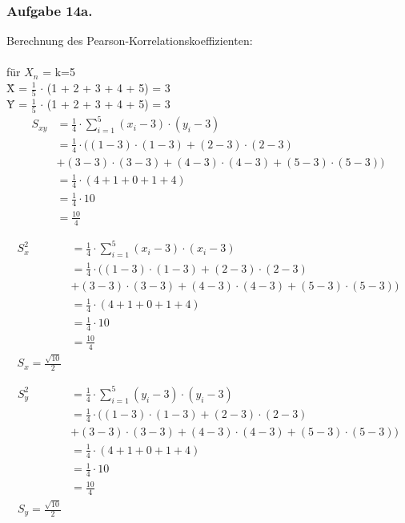 \documentclass[a4paper,12pt]{article}
\newcommand{\ex}[1]{\newpage\subsubsection*{Aufgabe #1.}}
\begin{document}
	\ex{14a}
	
	Berechnung des Pearson-Korrelationskoeffizienten:\\\\
	
	für $X_{n}$ = k=5 \\
	
	\={X} = $\frac{1}{5}$ $\cdot$ (1 + 2 + 3 + 4 + 5) = 3\\
	\={Y} = $\frac{1}{5}$ $\cdot$ (1 + 2 + 3 + 4 + 5) = 3\\
	
	
	\begin{align*}
	S_{xy} 
	&= \frac{1}{4} \cdot \sum_{i=1}^{5} (x_{i}-3) \cdot (y_{i}-3) \\
	&= \frac{1}{4} \cdot( (1-3)\cdot (1-3) + (2-3)\cdot (2-3) \\
	&+ (3-3)\cdot (3-3) + (4-3)\cdot (4-3) + (5-3)\cdot (5-3))\\
	&=  \frac{1}{4} \cdot( 4 + 1 + 0 + 1 + 4  )	\\
	&=  \frac{1}{4} \cdot 10 \\
	&= \frac{10}{4}\\\\
	\end{align*}
	\begin{align*}
	S_{x}^2 
	&= \frac{1}{4} \cdot \sum_{i=1}^{5} (x_{i}-3) \cdot (x_{i}-3) \\
	&= \frac{1}{4} \cdot( (1-3)\cdot (1-3) + (2-3)\cdot (2-3) \\
	&+ (3-3)\cdot (3-3) + (4-3)\cdot (4-3) + (5-3)\cdot (5-3))\\
	&=  \frac{1}{4} \cdot( 4 + 1 + 0 + 1 + 4  )	\\
	&=  \frac{1}{4} \cdot 10 \\
	&= \frac{10}{4}\\
	S_{x} =\frac{\sqrt{10}}{2}\\\\
	\end{align*}
	\newpage
	\begin{align*}
	S_{y}^2 
	&= \frac{1}{4} \cdot \sum_{i=1}^{5} (y_{i}-3) \cdot (y_{i}-3) \\
	&= \frac{1}{4} \cdot( (1-3)\cdot (1-3) + (2-3)\cdot (2-3) \\
	&+ (3-3)\cdot (3-3) + (4-3)\cdot (4-3) + (5-3)\cdot (5-3))\\
	&=  \frac{1}{4} \cdot( 4 + 1 + 0 + 1 + 4  )	\\
	&=  \frac{1}{4} \cdot 10 \\
	&= \frac{10}{4}\\
	S_{y} =\frac{\sqrt{10}}{2}\\
	\end{align*}
	
\end{document}
